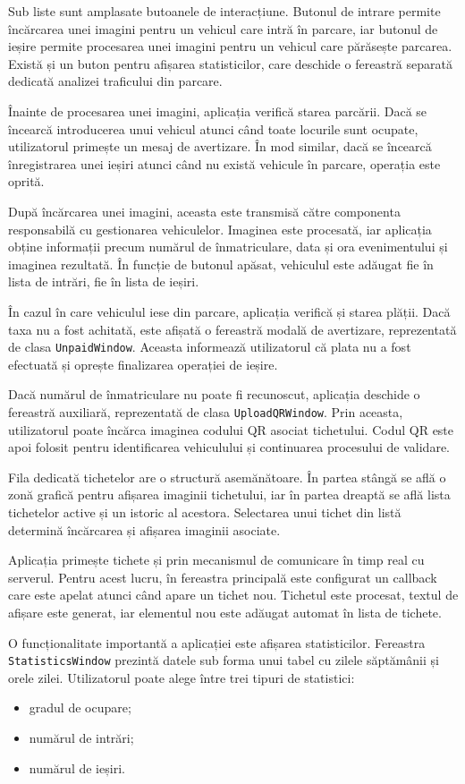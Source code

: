 Sub liste sunt amplasate butoanele de interacțiune. Butonul de intrare permite încărcarea unei imagini pentru un vehicul care intră în parcare, iar butonul de ieșire permite procesarea unei imagini pentru un vehicul care părăsește parcarea. Există și un buton pentru afișarea statisticilor, care deschide o fereastră separată dedicată analizei traficului din parcare.

Înainte de procesarea unei imagini, aplicația verifică starea parcării. Dacă se încearcă introducerea unui vehicul atunci când toate locurile sunt ocupate, utilizatorul primește un mesaj de avertizare. În mod similar, dacă se încearcă înregistrarea unei ieșiri atunci când nu există vehicule în parcare, operația este oprită.

După încărcarea unei imagini, aceasta este transmisă către componenta responsabilă cu gestionarea vehiculelor. Imaginea este procesată, iar aplicația obține informații precum numărul de înmatriculare, data și ora evenimentului și imaginea rezultată. În funcție de butonul apăsat, vehiculul este adăugat fie în lista de intrări, fie în lista de ieșiri.

În cazul în care vehiculul iese din parcare, aplicația verifică și starea plății. Dacă taxa nu a fost achitată, este afișată o fereastră modală de avertizare, reprezentată de clasa \texttt{UnpaidWindow}. Aceasta informează utilizatorul că plata nu a fost efectuată și oprește finalizarea operației de ieșire.

Dacă numărul de înmatriculare nu poate fi recunoscut, aplicația deschide o fereastră auxiliară, reprezentată de clasa \texttt{UploadQRWindow}. Prin aceasta, utilizatorul poate încărca imaginea codului QR asociat tichetului. Codul QR este apoi folosit pentru identificarea vehiculului și continuarea procesului de validare.

Fila dedicată tichetelor are o structură asemănătoare. În partea stângă se află o zonă grafică pentru afișarea imaginii tichetului, iar în partea dreaptă se află lista tichetelor active și un istoric al acestora. Selectarea unui tichet din listă determină încărcarea și afișarea imaginii asociate.

Aplicația primește tichete și prin mecanismul de comunicare în timp real cu serverul. Pentru acest lucru, în fereastra principală este configurat un callback care este apelat atunci când apare un tichet nou. Tichetul este procesat, textul de afișare este generat, iar elementul nou este adăugat automat în lista de tichete.

\begin{sloppypar}
O funcționalitate importantă a aplicației este afișarea statisticilor. Fereastra \texttt{StatisticsWindow} prezintă datele sub forma unui tabel cu zilele săptămânii și orele zilei. Utilizatorul poate alege între trei tipuri de statistici:
\end{sloppypar}
\begin{itemize}
    \item gradul de ocupare;
    \item numărul de intrări;
    \item numărul de ieșiri.
\end{itemize}

